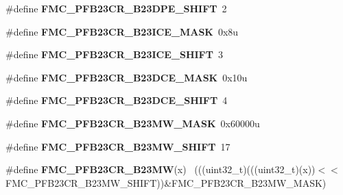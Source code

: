 \begin{DoxyCompactItemize}
\item 
\hypertarget{group___f_m_c___register___masks_ga9cf5333e68d80969795a330d919f3ae8}{}\#define {\bfseries F\+M\+C\+\_\+\+P\+F\+B23\+C\+R\+\_\+\+B23\+D\+P\+E\+\_\+\+S\+H\+I\+F\+T}~2\label{group___f_m_c___register___masks_ga9cf5333e68d80969795a330d919f3ae8}

\item 
\hypertarget{group___f_m_c___register___masks_ga8152681ff7e9e7ce74b9e91e98212ef5}{}\#define {\bfseries F\+M\+C\+\_\+\+P\+F\+B23\+C\+R\+\_\+\+B23\+I\+C\+E\+\_\+\+M\+A\+S\+K}~0x8u\label{group___f_m_c___register___masks_ga8152681ff7e9e7ce74b9e91e98212ef5}

\item 
\hypertarget{group___f_m_c___register___masks_ga971a745497e425de6b2c0f1716bd655e}{}\#define {\bfseries F\+M\+C\+\_\+\+P\+F\+B23\+C\+R\+\_\+\+B23\+I\+C\+E\+\_\+\+S\+H\+I\+F\+T}~3\label{group___f_m_c___register___masks_ga971a745497e425de6b2c0f1716bd655e}

\item 
\hypertarget{group___f_m_c___register___masks_ga06a6efc2b73b0f2a46d2be14357a09c2}{}\#define {\bfseries F\+M\+C\+\_\+\+P\+F\+B23\+C\+R\+\_\+\+B23\+D\+C\+E\+\_\+\+M\+A\+S\+K}~0x10u\label{group___f_m_c___register___masks_ga06a6efc2b73b0f2a46d2be14357a09c2}

\item 
\hypertarget{group___f_m_c___register___masks_ga0c022a8716d977a30574d6fc891ff66c}{}\#define {\bfseries F\+M\+C\+\_\+\+P\+F\+B23\+C\+R\+\_\+\+B23\+D\+C\+E\+\_\+\+S\+H\+I\+F\+T}~4\label{group___f_m_c___register___masks_ga0c022a8716d977a30574d6fc891ff66c}

\item 
\hypertarget{group___f_m_c___register___masks_ga759048d9080d5b5ff564dd6408089e01}{}\#define {\bfseries F\+M\+C\+\_\+\+P\+F\+B23\+C\+R\+\_\+\+B23\+M\+W\+\_\+\+M\+A\+S\+K}~0x60000u\label{group___f_m_c___register___masks_ga759048d9080d5b5ff564dd6408089e01}

\item 
\hypertarget{group___f_m_c___register___masks_gaf500b7fa5896b2c0ec9f5ebfd2c56752}{}\#define {\bfseries F\+M\+C\+\_\+\+P\+F\+B23\+C\+R\+\_\+\+B23\+M\+W\+\_\+\+S\+H\+I\+F\+T}~17\label{group___f_m_c___register___masks_gaf500b7fa5896b2c0ec9f5ebfd2c56752}

\item 
\hypertarget{group___f_m_c___register___masks_ga5055e7fea285618584b65ff0730eb284}{}\#define {\bfseries F\+M\+C\+\_\+\+P\+F\+B23\+C\+R\+\_\+\+B23\+M\+W}(x)                                      ~(((uint32\+\_\+t)(((uint32\+\_\+t)(x))$<$$<$F\+M\+C\+\_\+\+P\+F\+B23\+C\+R\+\_\+\+B23\+M\+W\+\_\+\+S\+H\+I\+F\+T))\&F\+M\+C\+\_\+\+P\+F\+B23\+C\+R\+\_\+\+B23\+M\+W\+\_\+\+M\+A\+S\+K)\label{group___f_m_c___register___masks_ga5055e7fea285618584b65ff0730eb284}


\end{DoxyCompactItemize}
